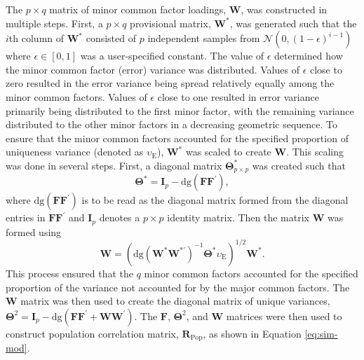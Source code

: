 \documentclass[
  english,
  man]{apa6}
\begin{document}
The \(p \times q\) matrix of minor common factor loadings, \(\mathbf{W}\), was constructed in multiple steps. First, a \(p \times q\) provisional matrix, \(\mathbf{W}^*\), was generated such that the \(i\)th column of \(\mathbf{W}^*\) consisted of \(p\) independent samples from \(\mathcal{N}(0, (1 - \epsilon)^{i-1})\) where \(\epsilon \in [0,1]\) was a user-specified constant. The value of \(\epsilon\) determined how the minor common factor (error) variance was distributed. Values of \(\epsilon\) close to zero resulted in the error variance being spread relatively equally among the minor common factors. Values of \(\epsilon\) close to one resulted in error variance primarily being distributed to the first minor factor, with the remaining variance distributed to the other minor factors in a decreasing geometric sequence. To ensure that the minor common factors accounted for the specified proportion of uniqueness variance (denoted as \(\upsilon_{\textrm{E}}\)), \(\mathbf{W}^*\) was scaled to create \(\mathbf{W}\). This scaling was done in several steps. First, a diagonal matrix \(\mathbf{\Theta}^*_{p \times p}\) was created such that
\begin{equation}
\mathbf{\Theta}^* = \mathbf{I}_p - \textrm{dg}(\mathbf{F}\mathbf{F}^\prime),
\label{eq:theta-star}
\end{equation}
where \(\textrm{dg}(\mathbf{F}\mathbf{F}^\prime)\) is to be read as the diagonal matrix formed from the diagonal entries in \(\mathbf{F}\mathbf{F}^\prime\) and \(\mathbf{I}_p\) denotes a \(p \times p\) identity matrix. Then the matrix \(\mathbf{W}\) was formed using
\begin{equation}
\mathbf{W} = (\textrm{dg}(\mathbf{W}^* \mathbf{W}^{*\prime})^{-1} \mathbf{\Theta}^* \upsilon_\textrm{E})^{1/2} \mathbf{W}^*.
\label{eq:W-matrix}
\end{equation}
This process ensured that the \(q\) minor common factors accounted for the specified proportion of the variance not accounted for by the major common factors. The \(\mathbf{W}\) matrix was then used to create the diagonal matrix of unique variances, \(\mathbf{\Theta}^2 = \mathbf{I}_p - \textrm{dg}(\mathbf{FF}^\prime + \mathbf{WW}^\prime)\). The \(\mathbf{F}\), \(\mathbf{\Theta}^2\), and \(\mathbf{W}\) matrices were then used to construct population correlation matrix, \(\mathbf{R}_{\textrm{Pop}}\), as shown in Equation \eqref{eq:sim-mod}.
\end{document}
